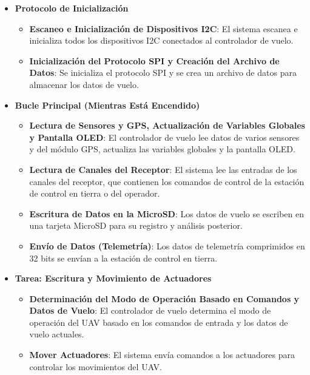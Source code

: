                     \begin{itemize}
                        \item \textbf{Protocolo de Inicialización}
                        \begin{itemize}
                            \item \textbf{Escaneo e Inicialización de Dispositivos I2C}: El sistema escanea e inicializa todos los dispositivos I2C conectados al controlador de vuelo.
                            \item \textbf{Inicialización del Protocolo SPI y Creación del Archivo de Datos}: Se inicializa el protocolo SPI y se crea un archivo de datos para almacenar los datos de vuelo.
                        \end{itemize}
                        
                        \item \textbf{Bucle Principal (Mientras Está Encendido)}
                        \begin{itemize}
                            \item \textbf{Lectura de Sensores y GPS, Actualización de Variables Globales y Pantalla OLED}: El controlador de vuelo lee datos de varios sensores y del módulo GPS, actualiza las variables globales y la pantalla OLED.
                            \item \textbf{Lectura de Canales del Receptor}: El sistema lee las entradas de los canales del receptor, que contienen los comandos de control de la estación de control en tierra o del operador.
                            \item \textbf{Escritura de Datos en la MicroSD}: Los datos de vuelo se escriben en una tarjeta MicroSD para su registro y análisis posterior.
                            \item \textbf{Envío de Datos (Telemetría)}: Los datos de telemetría comprimidos en 32 bits se envían a la estación de control en tierra.
                        \end{itemize}
                    
                        \item \textbf{Tarea: Escritura y Movimiento de Actuadores}
                        \begin{itemize}
                            \item \textbf{Determinación del Modo de Operación Basado en Comandos y Datos de Vuelo}: El controlador de vuelo determina el modo de operación del UAV basado en los comandos de entrada y los datos de vuelo actuales.
                            \item \textbf{Mover Actuadores}: El sistema envía comandos a los actuadores para controlar los movimientos del UAV.
                        \end{itemize}
                    \end{itemize}


